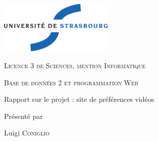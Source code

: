 \thispagestyle{empty}

\begin{center}
       \noindent
       \includegraphics[height=2.5cm]{./pics/uds.eps}       
       
       \vfill\vfill

    {\large \textsc{Licence 3 de Sciences, mention Informatique}}

    \bigskip\bigskip

    {\large \textsc{Base de données 2 et programmation Web}}

    \vfill\vfill

    {\huge \sc
      \begin{center}
        Rapport sur le projet : site de préférences vidéos
      \end{center}}

    \vfill\vfill

    {\large Présenté par}

\medskip

    {\large Luigi  \textsc{Coniglio}}\\
\bigskip

\end{center}
